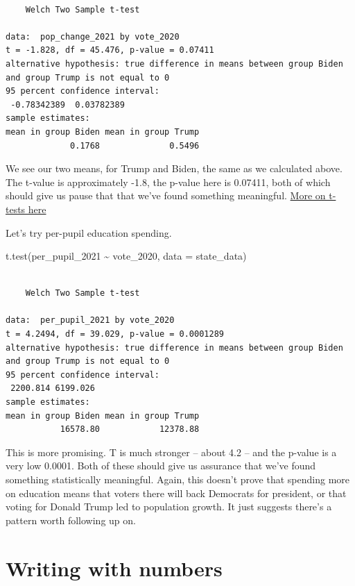 \documentclass[
  letterpaper,
  DIV=11,
  numbers=noendperiod]{scrreprt}
\newenvironment{Shaded}{\begin{snugshade}}{\end{snugshade}}
\newcommand{\AttributeTok}[1]{\textcolor[rgb]{0.40,0.45,0.13}{#1}}
\newcommand{\FunctionTok}[1]{\textcolor[rgb]{0.28,0.35,0.67}{#1}}
\newcommand{\NormalTok}[1]{\textcolor[rgb]{0.00,0.23,0.31}{#1}}
\newcommand{\SpecialCharTok}[1]{\textcolor[rgb]{0.37,0.37,0.37}{#1}}
\begin{document}
\begin{verbatim}

    Welch Two Sample t-test

data:  pop_change_2021 by vote_2020
t = -1.828, df = 45.476, p-value = 0.07411
alternative hypothesis: true difference in means between group Biden and group Trump is not equal to 0
95 percent confidence interval:
 -0.78342389  0.03782389
sample estimates:
mean in group Biden mean in group Trump 
             0.1768              0.5496 
\end{verbatim}

We see our two means, for Trump and Biden, the same as we calculated
above. The t-value is approximately -1.8, the p-value here is 0.07411,
both of which should give us pause that that we've found something
meaningful.
\href{https://conjointly.com/kb/statistical-student-t-test/}{More on
t-tests here}

Let's try per-pupil education spending.

\begin{Shaded}
\begin{Highlighting}[]
\FunctionTok{t.test}\NormalTok{(per\_pupil\_2021 }\SpecialCharTok{\textasciitilde{}}\NormalTok{ vote\_2020, }\AttributeTok{data =}\NormalTok{ state\_data)}
\end{Highlighting}
\end{Shaded}

\begin{verbatim}

    Welch Two Sample t-test

data:  per_pupil_2021 by vote_2020
t = 4.2494, df = 39.029, p-value = 0.0001289
alternative hypothesis: true difference in means between group Biden and group Trump is not equal to 0
95 percent confidence interval:
 2200.814 6199.026
sample estimates:
mean in group Biden mean in group Trump 
           16578.80            12378.88 
\end{verbatim}

This is more promising. T is much stronger -- about 4.2 -- and the
p-value is a very low 0.0001. Both of these should give us assurance
that we've found something statistically meaningful. Again, this doesn't
prove that spending more on education means that voters there will back
Democrats for president, or that voting for Donald Trump led to
population growth. It just suggests there's a pattern worth following up
on.


\hypertarget{writing-with-numbers}{%
\chapter{Writing with numbers}\label{writing-with-numbers}}
\end{document}
